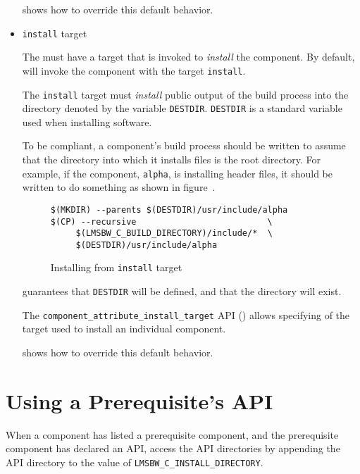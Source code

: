 \begin{itemize}
   shows how to override this
  default behavior.

\item \texttt{install} target

  The \makefile must have a target that is invoked to \emph{install}
  the component.  By default, \lmsbw will invoke the component
  \makefile with the target \texttt{install}.

  The \texttt{install} target must \emph{install} public output of the
  build process into the directory denoted by the \makefile variable
  \texttt{DESTDIR}.  \texttt{DESTDIR} is a standard \make variable
  used when installing software.

  To be compliant, a component's build process should be written to
  assume that the directory into which it installs files is the root
  directory.  For example, if the component, \texttt{alpha}, is
  installing header files, it should be written to do something as
  shown in figure~.

\begin{figure}
\hrulefill
\begin{verbatim}
$(MKDIR) --parents $(DESTDIR)/usr/include/alpha
$(CP) --recursive                          \
     $(LMSBW_C_BUILD_DIRECTORY)/include/*  \
     $(DESTDIR)/usr/include/alpha
\end{verbatim}
\hrulefill
\caption{Installing from \texttt{install} target}\label{wrap:install-target}
\end{figure}

  \lmsbw guarantees that \texttt{DESTDIR} will be defined, and that
  the directory will exist.

  The \texttt{component\_attribute\_install\_target} API
  () allows specifying of
  the target used to install an individual component.

   shows how to override this
  default behavior.

\end{itemize}

\section{Using a Prerequisite's API}\label{wrap:using-prerequisite-api}

When a component has listed a prerequisite component, and the
prerequisite component has declared an API, access the API directories
by appending the API directory to the value of
\texttt{LMSBW\_C\_INSTALL\_DIRECTORY}.

